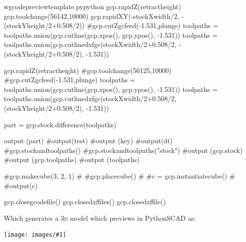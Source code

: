 \documentclass{ltxdoc}
\newcommand{\includeimage}[1]{\bigskip\noindent\texttt{[image: images/\#1]}\bigskip}
\begin{document}
\begin{writecode}{w}{gcodepreviewtemplate.py}{python}
gcp.rapidZ(retractheight)
gcp.toolchange(56142,10000)
gcp.rapidXY(-stockXwidth/2, -(stockYheight/2+0.508/2))
#gcp.cutZgcfeed(-1.531,plunge)
toolpaths = toolpaths.union(gcp.cutline(gcp.xpos(), gcp.ypos(), -1.531))
toolpaths = toolpaths.union(gcp.cutlinedxfgc(stockXwidth/2+0.508/2, -(stockYheight/2+0.508/2), -1.531))

gcp.rapidZ(retractheight)
#gcp.toolchange(56125,10000)
#gcp.cutZgcfeed(-1.531,plunge)
toolpaths = toolpaths.union(gcp.cutline(gcp.xpos(), gcp.ypos(), -1.531))
toolpaths = toolpaths.union(gcp.cutlinedxfgc(stockXwidth/2+0.508/2, (stockYheight/2+0.508/2), -1.531))


part = gcp.stock.difference(toolpaths)

output (part)
#output(test)
#output (key)
#output(dt)
#gcp.stockandtoolpaths()
#gcp.stockandtoolpaths("stock")
#output (gcp.stock)
#output (gcp.toolpaths)
#output (toolpaths)

#gcp.makecube(3, 2, 1)
#
#gcp.placecube()
#
#c = gcp.instantiatecube()
#
#output(c)

gcp.closegcodefile()
gcp.closedxffiles()
gcp.closedxffile()
\end{writecode}
\addtocounter{gcptmplpy}{138}

\begin{samepage}
\noindent Which generates a \textsc{3d} model which previews in PythonSCAD as:

\bigskip

\includeimage{gcodepreviewtemplate.png}
\end{samepage}
\end{document}
